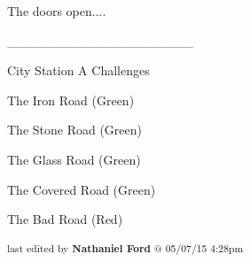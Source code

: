 The doors open....



\_\_\_\_\_\_\_\_\_\_\_\_\_\_\_\_\_\_\_\_



 {\LARGE City Station A Challenges } 



The Iron Road (Green)

The Stone Road (Green)

The Glass Road (Green)

The Covered Road (Green)

The Bad Road (Red)



\vspace{\fill}

\begin{flushright}
\textsubscript{last edited by \textbf{Nathaniel Ford} @ 05/07/15 4:28pm}
\end{flushright}

